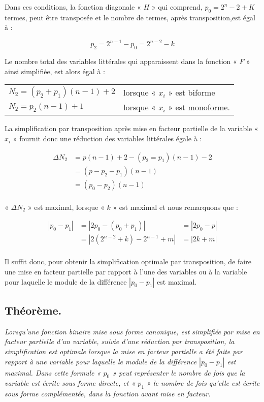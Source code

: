 Dans ces conditions, la fonction diagonale « $H$ » qui comprend, $p_0 = 2^n-2 +K$ termes, peut être transposée et le nombre de termes, après transposition,est égal à : 

\[ p_2 = 2^{n-1} - p_0 = 2^{n-2} -k \]

Le nombre total des variables littérales qui apparaissent dans la fonction « $F$ » ainsi simplifiée, est alors égal à :

\begin{tabular}{ll}
$N_2 = (p_2 + p_1) (n-1) +2$  & lorsque « $x_i$ » est biforme \\
$N_2 = p_2 (n-1) + 1$ & lorsque « $x_i$ » est monoforme. \\
\end{tabular}

La simplification par transposition après mise en facteur partielle de la variable « $x_i$ » fournit donc une réduction des variables littérales égale à : 

\[  
\begin{aligned}
\Delta N_2    & = p (n-1) +2 - (p_2 = p_1) (n-1) -2 \\
              & = (p - p_2 - p_1) (n -1) \\
              & = (p_0 - p_2) (n -1) \\
\end{aligned} 
\]                        

\centerline {   }

« $\Delta N_2$ » est maximal, lorsque « $k$ » est maximal et nous remarquons que : 

\[  \begin{aligned}
 | p_0 - p_1 | & = | 2 p_0 - (p_0 + p_1) | & = | 2 p_0 - p | \\
               & = | 2 (2^{n-2} + k) -2^{n-1} + m |  & = | 2k + m |\\
\end{aligned} 
\] 

Il suffit donc, pour obtenir la simplification optimale par transposition, de faire une mise en facteur partielle par rapport 
à l'une des variables ou à la variable pour laquelle le module de la différence  $| p_0 - p_1 |$ est maximal. 


\subsection{Théorème.} \textsl{Lorsqu'une fonction binaire mise sous forme canonique, est simplifiée par mise en facteur partielle d'un variable, suivie d'une réduction par transposition, la simplification est optimale lorsque la mise en facteur partielle a été faite par rapport à une variable pour laquelle le module de la différence $|p_0 - p_1|$ est maximal. Dans cette formule « $p_0$ » peut représenter le nombre de fois que la variable est écrite sous forme directe, et « $p_1$ »  le nombre de fois qu'elle est écrite sous forme complémentée, dans la fonction avant mise en facteur.}


